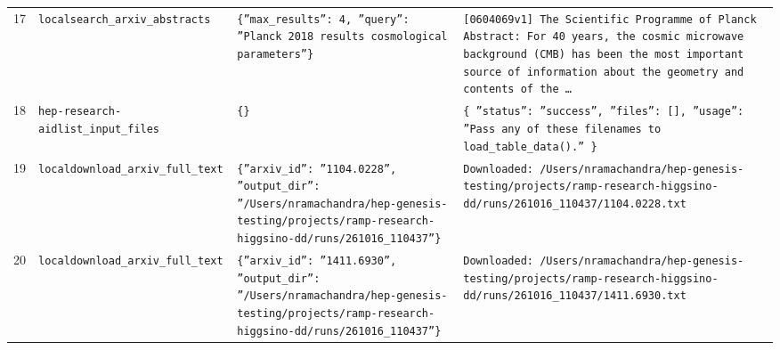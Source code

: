 \documentclass[11pt,a4paper]{article}
\begin{document}
\begin{longtable}{@{}p{}p{}p{}p{}@{}}
17 & \texttt{local}\newline\texttt{search\_\allowbreak{}arxiv\_\allowbreak{}abstracts} & \texttt{\{''max\_\allowbreak{}results'':\allowbreak{} 4,\allowbreak{} ''query'':\allowbreak{} ''Planck 2018 results cosmological parameters''\}\allowbreak{}} & \texttt{[0604069v1]\allowbreak{} The Scientific Programme of Planck Abstract:\allowbreak{}   For 40 years,\allowbreak{} the cosmic microwave background (CMB)\allowbreak{} has been the most important source of information about the geometry and contents of the \ldots{}\allowbreak{}} \\
18 & \texttt{hep-research-aid}\newline\texttt{list\_\allowbreak{}input\_\allowbreak{}files} & \texttt{\{\}\allowbreak{}} & \texttt{\{   ''status'':\allowbreak{} ''success'',\allowbreak{}   ''files'':\allowbreak{} []\allowbreak{},\allowbreak{}   ''usage'':\allowbreak{} ''Pass any of these filenames to load\_\allowbreak{}table\_\allowbreak{}data()\allowbreak{}.'' \}\allowbreak{}} \\
19 & \texttt{local}\newline\texttt{download\_\allowbreak{}arxiv\_\allowbreak{}full\_\allowbreak{}text} & \texttt{\{''arxiv\_\allowbreak{}id'':\allowbreak{} ''1104.0228'',\allowbreak{} ''output\_\allowbreak{}dir'':\allowbreak{} ''/\allowbreak{}Users/\allowbreak{}nramachandra/\allowbreak{}hep-genesis-testing/\allowbreak{}projects/\allowbreak{}ramp-research-higgsino-dd/\allowbreak{}runs/\allowbreak{}261016\_\allowbreak{}110437''\}\allowbreak{}} & \texttt{Downloaded:\allowbreak{} /\allowbreak{}Users/\allowbreak{}nramachandra/\allowbreak{}hep-genesis-testing/\allowbreak{}projects/\allowbreak{}ramp-research-higgsino-dd/\allowbreak{}runs/\allowbreak{}261016\_\allowbreak{}110437/\allowbreak{}1104.0228.txt} \\
20 & \texttt{local}\newline\texttt{download\_\allowbreak{}arxiv\_\allowbreak{}full\_\allowbreak{}text} & \texttt{\{''arxiv\_\allowbreak{}id'':\allowbreak{} ''1411.6930'',\allowbreak{} ''output\_\allowbreak{}dir'':\allowbreak{} ''/\allowbreak{}Users/\allowbreak{}nramachandra/\allowbreak{}hep-genesis-testing/\allowbreak{}projects/\allowbreak{}ramp-research-higgsino-dd/\allowbreak{}runs/\allowbreak{}261016\_\allowbreak{}110437''\}\allowbreak{}} & \texttt{Downloaded:\allowbreak{} /\allowbreak{}Users/\allowbreak{}nramachandra/\allowbreak{}hep-genesis-testing/\allowbreak{}projects/\allowbreak{}ramp-research-higgsino-dd/\allowbreak{}runs/\allowbreak{}261016\_\allowbreak{}110437/\allowbreak{}1411.6930.txt} \\

\end{longtable}
\end{document}
